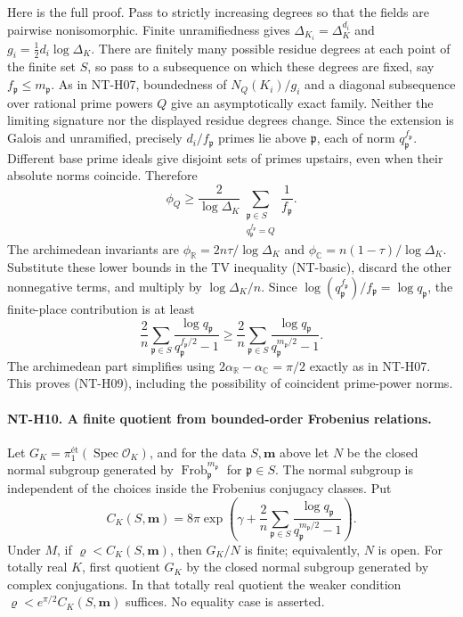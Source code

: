 \documentclass[11pt,a4paper]{article}
\begin{document}
Here is the full proof.  Pass to strictly increasing degrees so that
the fields are pairwise nonisomorphic.  Finite unramifiedness gives
$\Delta_{K_i}=\Delta_K^{d_i}$ and
$g_i=\tfrac12 d_i\log\Delta_K$.
There are finitely many possible residue degrees at each point of
the finite set $S$, so pass to a subsequence on which these degrees
are fixed, say $f_{\mathfrak p}\le m_{\mathfrak p}$.
As in NT-H07, boundedness of $N_Q(K_i)/g_i$ and a diagonal
subsequence over rational prime powers $Q$ give an asymptotically
exact family.  Neither the limiting signature nor the displayed
residue degrees change.  Since the extension is Galois and
unramified, precisely $d_i/f_{\mathfrak p}$ primes lie above
$\mathfrak p$, each of norm $q_{\mathfrak p}^{f_{\mathfrak p}}$.
Different base prime ideals give disjoint sets of primes upstairs,
even when their absolute norms coincide.  Therefore
\[
 \phi_Q\ge\frac2{\log\Delta_K}
       \sum_{\substack{\mathfrak p\in S\\
                    q_{\mathfrak p}^{f_{\mathfrak p}}=Q}}
           \frac1{f_{\mathfrak p}}.
\]
The archimedean invariants are
$\phi_{\mathbb R}=2n\tau/\log\Delta_K$ and
$\phi_{\mathbb C}=n(1-\tau)/\log\Delta_K$.
Substitute these lower bounds in the TV inequality (NT-basic),
discard the other nonnegative terms, and multiply by
$\log\Delta_K/n$.  Since
$\log(q_{\mathfrak p}^{f_{\mathfrak p}})/f_{\mathfrak p}
=\log q_{\mathfrak p}$, the finite-place contribution is at least
\[
 \frac2n\sum_{\mathfrak p\in S}
      \frac{\log q_{\mathfrak p}}
           {q_{\mathfrak p}^{f_{\mathfrak p}/2}-1}
 \ge\frac2n\sum_{\mathfrak p\in S}
      \frac{\log q_{\mathfrak p}}
           {q_{\mathfrak p}^{m_{\mathfrak p}/2}-1}.
\]
The archimedean part simplifies using
$2\alpha_{\mathbb R}-\alpha_{\mathbb C}=\pi/2$ exactly as in
NT-H07.  This proves (NT-H09), including the possibility of
coincident prime-power norms.

\paragraph{NT-H10. A finite quotient from bounded-order Frobenius relations.}
Let
$G_K=\pi_1^{\text{ét}}(\operatorname{Spec}\mathcal O_K)$, and
for the data $S,\boldsymbol m$ above let $N$ be the closed normal
subgroup generated by
$\operatorname{Frob}_{\mathfrak p}^{m_{\mathfrak p}}$ for
$\mathfrak p\in S$.  The normal subgroup is independent of the
choices inside the Frobenius conjugacy classes.  Put
\[
 C_K(S,\boldsymbol m)=8\pi\exp\left(
       \gamma+\frac2n\sum_{\mathfrak p\in S}
       \frac{\log q_{\mathfrak p}}
            {q_{\mathfrak p}^{m_{\mathfrak p}/2}-1}\right).
\]
Under $M$, if $\varrho<C_K(S,\boldsymbol m)$, then $G_K/N$ is
finite; equivalently, $N$ is open.  For totally real $K$, first
quotient $G_K$ by the closed normal subgroup generated by complex
conjugations.  In that totally real quotient the weaker condition
$\varrho<e^{\pi/2}C_K(S,\boldsymbol m)$ suffices.  No equality
case is asserted.
\end{document}
